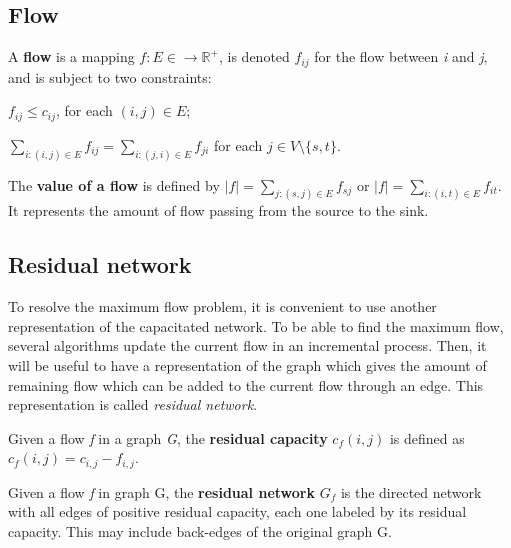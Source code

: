 \subsection{Flow}
\begin{definition}
\label{flow}
A \textbf{flow} is a mapping $f: E \in \to \mathbb{R}^{+}$, is denoted $f_{ij}$ for the flow between \textit{i} and \textit{j}, and is subject to two constraints:
\indent
\begin{description}
	\label{cap_constraint}
	\item[Capacity constraint] $f_{ij} \leq c_{ij}$, for each $(i, j) \in E$;
	\label{flow_constraint}
	\item[Flow conservation constraint] $\sum\limits_{i : (i,j) \in E} f_{ij} = \sum\limits_{i : (j,i) \in E} f_{ji}$ for each $j \in V \setminus \{s, t\}$.
\end{description}
\end{definition}

\begin{definition}
\label{vflow}
The \textbf{value of a flow} is defined by $\left\vert{f}\right\vert = \sum\limits_{j:(s,j) \in E} f_{sj}$ or $\left\vert{f}\right\vert = \sum\limits_{i:(i,t) \in E} f_{it}$. It represents the amount of flow passing from the source to the sink.
\end{definition}

\subsection{Residual network} 
To resolve the maximum flow problem, it is convenient to use another representation of the capacitated network. To be able to find the maximum flow, several algorithms update the current flow in an incremental process. Then, it will be useful to have a representation of the graph which gives the amount of remaining flow which can be added to the current flow through an edge. This representation is called \textit{residual network}.
\begin{definition}
\label{rcapacity}
Given a flow \textit{f} in a graph \textit{G}, the \textbf{residual capacity} $c_f (i,j)$ is defined as $c_f (i,j) = c_{i,j} - f_{i,j}$.
\end{definition}


\begin{definition}
\label{rnetwork}
Given a flow \textit{f} in graph G, the \textbf{residual network} $G_f$ is the directed network with all edges of positive residual capacity, each one labeled by its residual capacity. This may include back-edges of the original graph G.
\end{definition}

